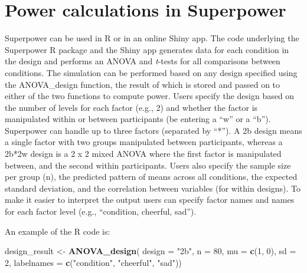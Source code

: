 \documentclass[
  ,jou,floatsintext]{apa6}
\newenvironment{Shaded}{\begin{snugshade}}{\end{snugshade}}
\newcommand{\DataTypeTok}[1]{\textcolor[rgb]{0.13,0.29,0.53}{#1}}
\newcommand{\DecValTok}[1]{\textcolor[rgb]{0.00,0.00,0.81}{#1}}
\newcommand{\KeywordTok}[1]{\textcolor[rgb]{0.13,0.29,0.53}{\textbf{#1}}}
\newcommand{\NormalTok}[1]{#1}
\newcommand{\StringTok}[1]{\textcolor[rgb]{0.31,0.60,0.02}{#1}}
\begin{document}
\hypertarget{power-calculations-in-superpower}{%
\section{Power calculations in Superpower}\label{power-calculations-in-superpower}}

Superpower can be used in R or in an online Shiny app.
The code underlying the Superpower R package and the Shiny app generates data for each condition in the design and performs an ANOVA and \emph{t}-tests for all comparisons between conditions.
The simulation can be performed based on any design specified using the ANOVA\_design function, the result of which is stored and passed on to either of the two functions to compute power.
Users specify the design based on the number of levels for each factor (e.g., 2) and whether the factor is manipulated within or between participants (be entering a \enquote{w} or a \enquote{b}).
Superpower can handle up to three factors (separated by \enquote{*}).
A 2b design means a single factor with two groups manipulated between participants, whereas a 2b*2w design is a 2 x 2 mixed ANOVA where the first factor is manipulated between, and the second within participants.
Users also specify the sample size per group (n), the predicted pattern of means across all conditions, the expected standard deviation, and the correlation between variables (for within designs).
To make it easier to interpret the output users can specify factor names and names for each factor level (e.g., \enquote{condition, cheerful, sad}).

An example of the R code is:

\begin{Shaded}
\begin{Highlighting}[]
\NormalTok{design_result <-}\StringTok{ }\KeywordTok{ANOVA_design}\NormalTok{(}
  \DataTypeTok{design =} \StringTok{"2b"}\NormalTok{, }\DataTypeTok{n =} \DecValTok{80}\NormalTok{, }
  \DataTypeTok{mu =} \KeywordTok{c}\NormalTok{(}\DecValTok{1}\NormalTok{, }\DecValTok{0}\NormalTok{), }\DataTypeTok{sd =} \DecValTok{2}\NormalTok{,}
  \DataTypeTok{labelnames =} \KeywordTok{c}\NormalTok{(}\StringTok{"condition"}\NormalTok{, }
                 \StringTok{"cheerful"}\NormalTok{, }\StringTok{"sad"}\NormalTok{))}
\end{Highlighting}
\end{Shaded}
\end{document}
